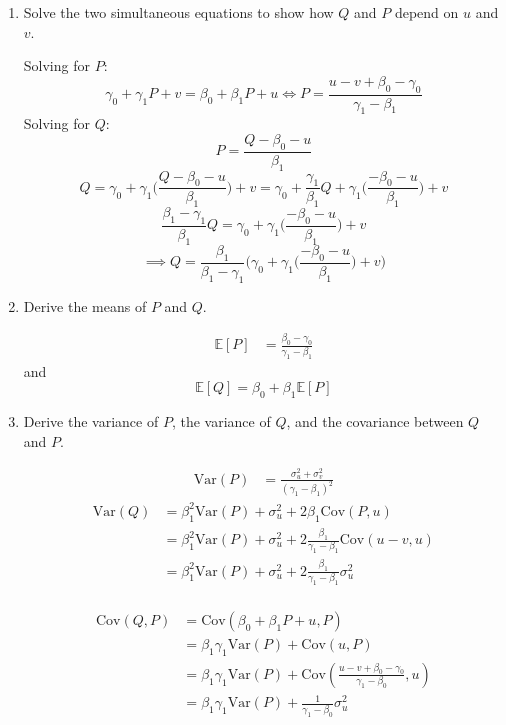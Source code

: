 \documentclass[11pt]{article}
\newcommand{\Var}{\text{Var}}
\newcommand{\Cov}{\text{Cov}}
\newcommand{\bbE}{\mathbb{E}}
\begin{document}
\begin{enumerate}
    \item Solve the two simultaneous equations to show how \( Q \) and \( P \) depend on \( u \) and \( v \).
    \begin{solution}
    Solving for $P:$
        \[\gamma_0 + \gamma_1 P + v = \beta_0 + \beta_1 P + u \iff \boxed{P = \frac{u- v +\beta_0- \gamma_0}{\gamma_1 - \beta_1}}\]
    Solving for $Q:$
        \[P = \frac{Q-\beta_0-u}{\beta_1}\] \[Q = \gamma_0+\gamma_1\Big(\frac{Q-\beta_0-u}{\beta_1}\Big)+v = \gamma_0+\frac{\gamma_1}{\beta_1}Q + \gamma_1\Big(\frac{-\beta_0-u}{\beta_1}\Big)+v\]
        \[\frac{\beta_1-\gamma_1}{\beta_1}Q = \gamma_0+ \gamma_1\Big(\frac{-\beta_0-u}{\beta_1}\Big)+v\]
        \[\implies Q = \frac{\beta_1}{\beta_1-\gamma_1}\Big(\gamma_0+ \gamma_1\Big(\frac{-\beta_0-u}{\beta_1}\Big)+v\Big)\]
    \end{solution}
    
    \item Derive the means of \( P \) and \( Q \).
    \begin{solution}
        \begin{align*}
            \bbE[P] &= \frac{\beta_0 - \gamma_0}{\gamma_1 - \beta_1}
        \end{align*}
        and 
        \[\bbE[Q] = \beta_0 + \beta_1 \bbE[P] \]
    \end{solution}
    
    \item Derive the variance of \( P \), the variance of \( Q \), and the covariance between \( Q \) and \( P \).
    \begin{solution}
        \begin{align*}
            \Var(P) &= \frac{\sigma_u^2 + \sigma_v^2}{(\gamma_1 - \beta_1)^2}
        \end{align*}
        \begin{align*}
            \Var(Q) &= \beta_1^2\Var(P) + \sigma_u^2 + 2\beta_1\Cov( P , u)\\
            &= \beta_1^2\Var(P) + \sigma_u^2 + 2\frac{\beta_1}{\gamma_1 - \beta_1}\Cov( u-v , u)\\
            &= \beta_1^2\Var(P) + \sigma_u^2 + 2\frac{\beta_1}{\gamma_1 - \beta_1} \sigma_u^2\\
        \end{align*}

        \begin{align*}
            \Cov(Q,P) &= \Cov(\beta_0 + \beta_1 P + u, P)\\
            &= \beta_1 \gamma_1\Var(P) + \Cov(u,P)\\
            &= \beta_1 \gamma_1 \Var(P) + \Cov(\frac{u-v + \beta_0 - \gamma_0}{\gamma_1 - \beta_0}, u)\\
            &= \beta_1 \gamma_1\Var(P) + \frac{1}{\gamma_1 - \beta_0} \sigma_u^2
        \end{align*}
    \end{solution}
    

\end{enumerate}
\end{document}
